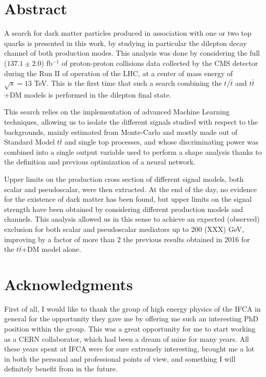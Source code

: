 \documentclass[a4paper, 10pt, openright]{report}
\begin{document}

\setlength{\parskip}{5pt}
\setcounter{page}{1}

\chapter*{Abstract}

A search for dark matter particles produced in association with one or two top quarks is presented in this work, by studying in particular the dilepton decay channel of both production modes. This analysis was done by considering the full ($137.1 \pm 2.0$) fb$^{-1}$ of proton-proton collisions data collected by the \ac{CMS} detector during the Run II of operation of the \ac{LHC}, at a center of mass energy of $\sqrt{s} = 13$ TeV. This is the first time that such a search combining the $t/\bar t$ and $t \bar t$+DM models is performed in the dilepton final state.

This search relies on the implementation of advanced Machine Learning techniques, allowing us to isolate the different signals studied with respect to the backgrounds, mainly estimated from Monte-Carlo and mostly made out of Standard Model $t \bar t$ and single top processes, and whose discriminating power was combined into a single output variable used to perform a shape analysis thanks to the definition and previous optimization of a neural network.

Upper limits on the production cross section of different signal models, both scalar and pseudoscalar, were then extracted. At the end of the day, no evidence for the existence of dark matter has been found, but upper limits on the signal strength have been obtained by considering different production models and channels. This analysis allowed us in this sense to achieve an expected (observed) exclusion for both scalar and pseudoscalar mediators up to 200 (XXX) GeV, improving by a factor of more than 2 the previous results obtained in 2016 for the $t \bar t$+DM model alone.

\chapter*{Acknowledgments}

First of all, I would like to thank the group of high energy physics of the \ac{IFCA} in general for the opportunity they gave me by offering me such an interesting PhD position within the group. This was a great opportunity for me to start working as a CERN collaborator, which had been a dream of mine for many years. All these years spent at \ac{IFCA} were for sure extremely interesting, brought me a lot in both the personal and professional points of view, and something I will definitely benefit from in the future.
\end{document}
